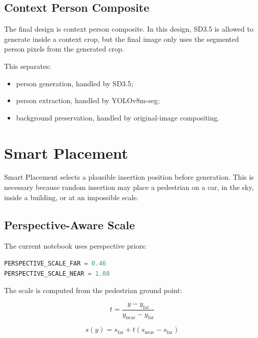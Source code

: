 \documentclass[12pt,a4paper]{article}
\begin{document}
\subsection{Context Person Composite}

The final design is context person composite. In this design, SD3.5 is allowed
to generate inside a context crop, but the final image only uses the segmented
person pixels from the generated crop.

This separates:

\begin{itemize}
    \item person generation, handled by SD3.5;
    \item person extraction, handled by YOLOv8m-seg;
    \item background preservation, handled by original-image compositing.
\end{itemize}

\section{Smart Placement}

Smart Placement selects a plausible insertion position before generation. This
is necessary because random insertion may place a pedestrian on a car, in the
sky, inside a building, or at an impossible scale.

\subsection{Perspective-Aware Scale}

The current notebook uses perspective priors:

\begin{lstlisting}[language=Python,caption={Current perspective scale values}]
PERSPECTIVE_SCALE_FAR = 0.46
PERSPECTIVE_SCALE_NEAR = 1.08
\end{lstlisting}

The scale is computed from the pedestrian ground point:

\begin{equation}
t =
\frac{y - y_{\text{far}}}
{y_{\text{near}} - y_{\text{far}}}
\end{equation}

\begin{equation}
s(y) =
s_{\text{far}} + t(s_{\text{near}} - s_{\text{far}})
\end{equation}
\end{document}

